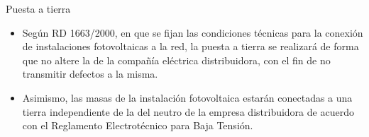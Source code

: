 \documentclass[xcolor={usenames,svgnames,dvipsnames}]{beamer}
\begin{document}
\begin{frame}[label=sec-5-2-7]{Puesta a tierra}
\begin{itemize}
\item Según RD 1663/2000, en que se fijan las condiciones técnicas para la
conexión de instalaciones fotovoltaicas a la red, \alert{la puesta a
tierra} se realizará de forma que \alert{no altere la de la compañía
eléctrica distribuidora}, con el fin de no transmitir defectos a la
misma.

\item Asimismo, \alert{las masas de la instalación fotovoltaica estarán
conectadas a una tierra independiente de la del neutro} de la empresa
distribuidora de acuerdo con el Reglamento Electrotécnico para Baja
Tensión.
\end{itemize}
\end{frame}
\end{document}
